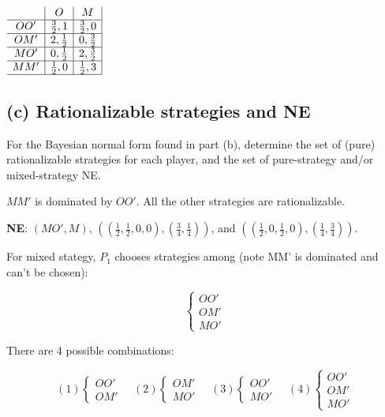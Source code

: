 \documentclass{article}
\begin{document}
\begin{center}
$
\begin{array}{c|c|c|}
 & O & M \\
\hline
OO' & \tfrac32,1 & \tfrac32,0 \\
\hline
OM' & 2,\tfrac12 & 0,\tfrac32 \\
\hline
MO' & 0,\tfrac12 & 2,\tfrac32 \\
\hline
MM' & \tfrac12,0 & \tfrac12,3 \\
\hline
\end{array}
$
\end{center}
%


\subsection*{(c) Rationalizable strategies and NE}

For the Bayesian normal form found in part (b), determine the set of
(pure) rationalizable strategies for each player, and the set of pure-strategy and/or
mixed-strategy NE.

\bigskip

$MM'$ is dominated by $OO'$.
All the other strategies are rationalizable.

\medskip

\textbf{NE}: $(MO', M)$, $\left( \left( \tfrac12, \tfrac12, 0, 0 \right), \left( \tfrac34, \tfrac14 \right) \right)$, and $\left( \left( \tfrac12, 0, \tfrac12, 0 \right), \left( \tfrac14, \tfrac34 \right) \right)$. 

\medskip

For mixed stategy, $P_1$ chooses strategies among (note MM' is dominated and can't be chosen):

\begin{equation}
    \begin{cases}
OO' \\ OM' \\ MO'
    \end{cases}
\nonumber
\end{equation}

There are 4 possible combinations:

\begin{equation}
(1)
    \begin{cases}
OO' \\ OM'
    \end{cases}
\quad (2)
    \begin{cases}
 OM' \\ MO'
    \end{cases}
 \quad (3) 
    \begin{cases}
OO'  \\ MO'
    \end{cases}
 \quad (4) 
    \begin{cases}
OO' \\ OM' \\ MO'
    \end{cases}
\nonumber
\end{equation}
\end{document}
